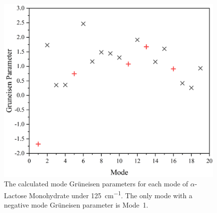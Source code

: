 \begin{figure}[h]
\centering
\includegraphics[scale=0.5]{Figures/Misc/QHA/GrunsModeG.png}
\captionsetup{font = footnotesize, justification = centering}
\caption[The Calculated Mode Gr\"uneisen Parameters for \(\alpha\)-Lactose Monohydrate]{The calculated mode Gr\"uneisen parameters for each mode of \(\alpha\)-Lactose Monohydrate under \SI{125}{cm^{-1}}. The only mode with a negative mode Gr\"uneisen parameter is Mode~1.}
\label{fig:gruns}
\end{figure}

